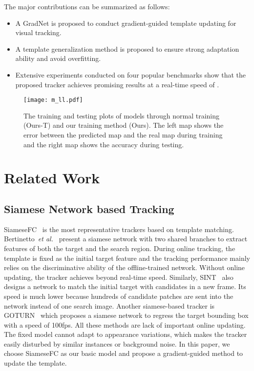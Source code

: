 \documentclass[10pt,twocolumn,letterpaper]{article}
\begin{document}
The major contributions can be summarized as follows:
\begin{itemize}
	\setlength{\itemsep}{4pt}
	\setlength{\parsep}{4pt}
	\setlength{\parskip}{4pt}
\item A GradNet is proposed to conduct gradient-guided template updating for visual tracking.
\item A template generalization method is proposed to ensure strong adaptation ability and avoid overfitting.
\item Extensive experiments conducted on four popular benchmarks show that the proposed tracker achieves promising results at a real-time speed of .
\end{itemize}


\begin{figure}[t]
	\centering
	\texttt{[image: m\_ll.pdf]}\\
	\caption{The training and testing plots of models through normal training (Ours-T) and our training method (Ours). The left map shows the error between the predicted map and the real map during training and the right map shows the accuracy during testing.} \label{fig:m_l}
\end{figure}

\section{Related Work}
\subsection{Siamese Network based Tracking}
SiameseFC~\cite{Bertinetto-ECCV16-SiamesFC} is the most representative trackers based on template matching.
Bertinetto~\emph{et al.}~\cite{Bertinetto-ECCV16-SiamesFC} present a siamese network
with two shared branches to extract features of both the target and the search region.
During online tracking, the template is fixed as the initial target feature and the tracking performance mainly relies on the discriminative ability of the offline-trained network.
Without online updating, the tracker achieves beyond real-time speed.
Similarly, SINT~\cite{Tao-CVPR16-SINT} also designs a network to match the initial target with candidates in a new frame. Its speed is much lower because hundreds of candidate patches are sent into the network instead of one search image.
Another siamese-based tracker is GOTURN~\cite{Held-ECCV16-GOTURN} which proposes a siamese network to regress the target bounding box with a speed of 100fps.
All these methods are lack of important online updating.
The fixed model cannot adapt to appearance variations, which makes the tracker easily disturbed by similar instances or background noise.
In this paper, we choose SiameseFC as our basic model and propose a gradient-guided method to update the template.
\end{document}
